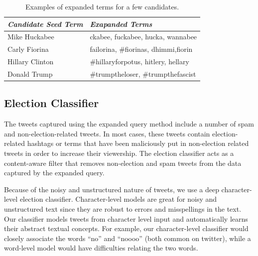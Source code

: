 \documentclass[letterpaper]{article}
\begin{document}

\begin{table}[h]
\centering
\small
\begin{tabular}{|l|l|}
\hline %
\emph{Candidate Seed Term} & \emph{Exapanded Terms} \\\hline
Mike Huckabee & ckabee, fuckabee, hucka, wannabee \\\hline
Carly Fiorina & failorina, \#fiorinas, dhimmi,fiorin\\\hline
Hillary Clinton &  \#hillaryforpotus, hitlery, hellary \\\hline
Donald Trump &  \#trumptheloser, \#trumpthefascist \\\hline
\end{tabular}
\caption{Examples of expanded terms for a few candidates.}
\label{tab:expand_1}
\end{table}




\subsection{Election Classifier}
The tweets captured using the expanded query method include a number of spam and non-election-related tweets. In most cases, these tweets contain election-related hashtags or terms that have been maliciously put in non-election related tweets in order to increase their viewership. The election classifier acts as a content-aware filter that removes non-election and spam tweets from the data captured by the expanded query.

Because of the noisy and unstructured nature of tweets, we use a deep character-level election classifier. Character-level models are great for noisy and unstructured text since they are robust to errors and misspellings in the text. Our classifier models tweets from character level input and automatically learns their abstract textual concepts. For example, our character-level classifier would closely associate the words ``no'' and ``noooo'' (both common on twitter), while a word-level model would have difficulties relating the two words.
\end{document}
